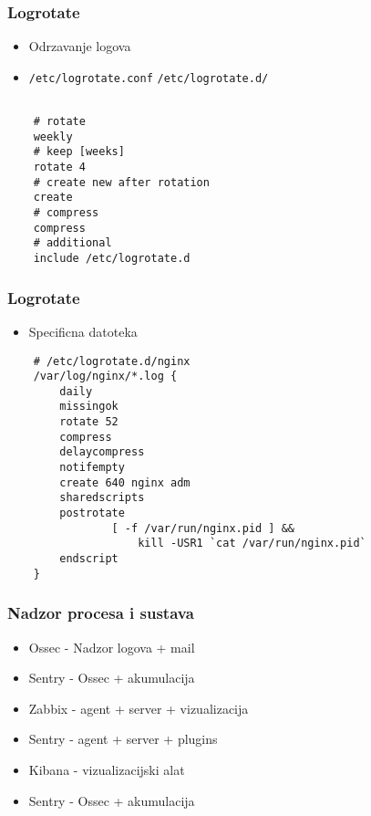 \documentclass[t,table,usenames,dvipsnames]{beamer}
\newcommand{\shell}[1]{\texttt{#1}}
\begin{document}
\begin{frame}[fragile]
    \frametitle{Logrotate}
    \begin{itemize}
        \item Odrzavanje logova
        \item \shell{/etc/logrotate.conf} \shell{/etc/logrotate.d/}
    \end{itemize}

    \begin{verbatim}

    # rotate
    weekly
    # keep [weeks]
    rotate 4
    # create new after rotation
    create
    # compress
    compress
    # additional
    include /etc/logrotate.d

    \end{verbatim}

\end{frame}

\begin{frame}[fragile]
    \frametitle{Logrotate}
    \begin{itemize}
        \item Specificna datoteka
    \end{itemize}
    \begin{verbatim}
    # /etc/logrotate.d/nginx
    /var/log/nginx/*.log {
        daily
        missingok
        rotate 52
        compress
        delaycompress
        notifempty
        create 640 nginx adm
        sharedscripts
        postrotate
                [ -f /var/run/nginx.pid ] && 
                    kill -USR1 `cat /var/run/nginx.pid`
        endscript
    }

    \end{verbatim}

\end{frame}

\begin{frame}
    \frametitle{Nadzor procesa i sustava}

    \begin{itemize}
        \item Ossec - Nadzor logova + mail
        \item Sentry - Ossec + akumulacija
        \item Zabbix - agent + server + vizualizacija
        \item Sentry - agent + server + plugins
        \item Kibana - vizualizacijski alat
        \item Sentry - Ossec + akumulacija
    \end{itemize}

\end{frame}
\end{document}
